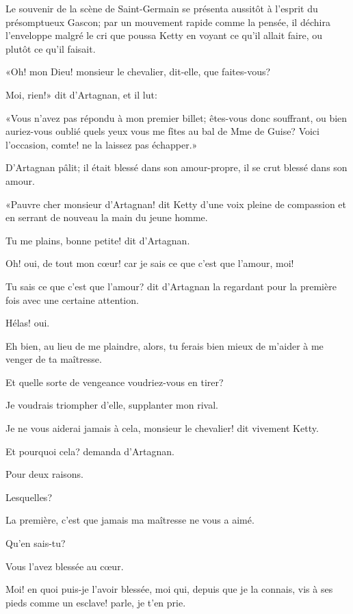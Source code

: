 Le souvenir de la scène de Saint-Germain se présenta aussitôt à l'esprit du présomptueux Gascon; par un mouvement rapide comme la pensée, il déchira l'enveloppe malgré le cri que poussa Ketty en voyant ce qu'il allait faire, ou plutôt ce qu'il faisait. 

«Oh! mon Dieu! monsieur le chevalier, dit-elle, que faites-vous? 

\speak  Moi, rien!» dit d'Artagnan, et il lut: 

«Vous n'avez pas répondu à mon premier billet; êtes-vous donc souffrant, ou bien auriez-vous oublié quels yeux vous me fîtes au bal de Mme de Guise? Voici l'occasion, comte! ne la laissez pas échapper.» 

D'Artagnan pâlit; il était blessé dans son amour-propre, il se crut blessé dans son amour. 

«Pauvre cher monsieur d'Artagnan! dit Ketty d'une voix pleine de compassion et en serrant de nouveau la main du jeune homme. 

\speak  Tu me plains, bonne petite! dit d'Artagnan. 

\speak  Oh! oui, de tout mon cœur! car je sais ce que c'est que l'amour, moi! 

\speak  Tu sais ce que c'est que l'amour? dit d'Artagnan la regardant pour la première fois avec une certaine attention. 

\speak  Hélas! oui. 

\speak  Eh bien, au lieu de me plaindre, alors, tu ferais bien mieux de m'aider à me venger de ta maîtresse. 

\speak  Et quelle sorte de vengeance voudriez-vous en tirer? 

\speak  Je voudrais triompher d'elle, supplanter mon rival. 

\speak  Je ne vous aiderai jamais à cela, monsieur le chevalier! dit vivement Ketty. 

\speak  Et pourquoi cela? demanda d'Artagnan. 

\speak  Pour deux raisons. 

\speak  Lesquelles? 

\speak  La première, c'est que jamais ma maîtresse ne vous a aimé. 

\speak  Qu'en sais-tu? 

\speak  Vous l'avez blessée au cœur. 

\speak  Moi! en quoi puis-je l'avoir blessée, moi qui, depuis que je la connais, vis à ses pieds comme un esclave! parle, je t'en prie. 

